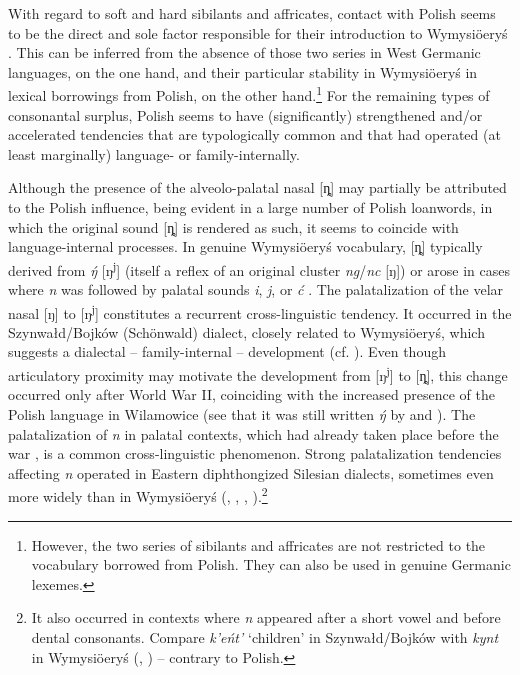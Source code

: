 \documentclass[output=paper,hidelinks]{langscibook}
\begin{document}
With regard to soft and hard sibilants and affricates, contact with Polish seems to be the direct and sole factor responsible for their introduction to Wymysiöeryś \citep{zak_influence_2016, andrason_polish_2014, andrason_szkic_2014, andrason_vilamovicean_2015, Andrason2021}. This can be inferred from the absence of those two series in West Germanic languages, on the one hand, and their particular stability in Wymysiöeryś in lexical borrowings from Polish, on the other hand.\footnote{However, the two series of sibilants and affricates are not restricted to the vocabulary borrowed from Polish. They can also be used in genuine Germanic lexemes.} For the remaining types of consonantal surplus, Polish seems to have (significantly) strengthened and/or accelerated tendencies that are typologically common and that had operated (at least marginally) language- or family-internally.

Although the presence of the alveolo-palatal nasal [ȵ] may partially be attributed to the Polish influence, being evident in a large number of Polish loanwords, in which the original sound [ȵ] is rendered as such, it seems to coincide with language-internal processes. In genuine Wymysiöeryś vocabulary, [ȵ] typically derived from \textit{\'{ŋ}} [ŋ\textsuperscript{j}] (itself a reflex of an original cluster \textit{ng}/\textit{nc} [ŋ]) or arose in cases where \textit{n} was followed by palatal sounds \textit{i}, \textit{j}, or \textit{ć} \citep{Andrason2021}. The palatalization of the velar nasal [ŋ] to [ŋ\textsuperscript{j}] constitutes a recurrent cross-linguistic tendency. It occurred in the Szynwałd/Bojków (Schönwald) dialect, closely related to Wymysiöeryś, which suggests a dialectal – family-internal – development (cf. \citealt[98--99]{gusinde_vergessene_1911}). Even though articulatory proximity may motivate the development from [ŋ\textsuperscript{j}] to [ȵ], this change occurred only after World War II, coinciding with the increased presence of the Polish language in Wilamowice (see that it was still written \textit{\'{ŋ}} by \citealt{kleczkowski_dialekt_1920} and \citealt{mojmir_worterbuch}). The palatalization of \textit{n} in palatal contexts, which had already taken place before the war \citep{kleczkowski_dialekt_1920}, is a common cross-linguistic phenomenon. Strong palatalization tendencies affecting \textit{n} operated in Eastern diphthongized Silesian dialects, sometimes even more widely than in Wymysiöeryś (\citealt[32, 41]{waniek_zum_1880}, \citealt[39--40]{von_unwerth_schlesische_1908}, \citealt[96--98, 115, 144]{gusinde_vergessene_1911}, \citealt{Andrason2021}).\footnote{It also occurred in contexts where \textit{n} appeared after a short vowel and before dental consonants. Compare \textit{k'eńt'} `children' in Szynwałd/Bojków with \textit{kynt} in Wymysiöeryś (\citealt[98]{gusinde_vergessene_1911}, \citealt[116]{kleczkowski_dialekt_1920}) -- contrary to Polish.}
\end{document}
